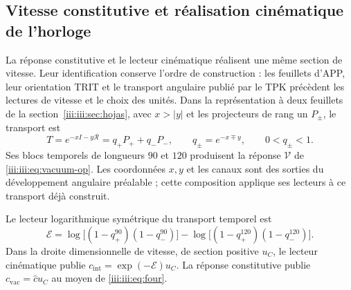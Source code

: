 \subsection{Vitesse constitutive et réalisation cinématique de l’horloge}
\label{iii:iii:sec:enlace-velocidad-constitutiva}

La réponse constitutive et le lecteur cinématique réalisent une même
section de vitesse. Leur identification conserve l’ordre de construction :
les feuillets d’APP, leur orientation TRIT et le transport angulaire publié
par le TPK précèdent les lectures de vitesse et le choix des unités.
Dans la représentation à deux feuillets de la
section~\ref{iii:iii:sec:hojas}, avec $x>|y|$ et les projecteurs de rang un
$P_\pm$, le transport est
\[
 T=e^{-xI-y\mathcal R}=q_+P_++q_-P_-,
 \qquad q_\pm=e^{-x\mp y},\qquad 0<q_\pm<1.
\]
Ses blocs temporels de longueurs $90$ et $120$ produisent la réponse
$\mathcal V$ de \eqref{iii:iii:eq:vacuum-op}. Les coordonnées $x,y$ et les
canaux sont des sorties du développement angulaire préalable ; cette composition
applique ses lecteurs à ce transport déjà construit.

Le lecteur logarithmique symétrique du transport temporel est
\begin{equation}
 \mathcal E=
 \log\!\bigl[(1-q_+^{90})(1-q_-^{90})\bigr]
 -\log\!\bigl[(1-q_+^{120})(1-q_-^{120})\bigr].
 \label{iii:iii:eq:velocidad-lector-simetrico}
\end{equation}
Dans la droite dimensionnelle de vitesse, de section positive $u_C$, le
lecteur cinématique publie $c_{\mathrm{int}}=\exp(-\mathcal E)u_C$.
La réponse constitutive publie
$c_{\mathrm{vac}}=\widehat c u_C$ au moyen de \eqref{iii:iii:eq:four}.


